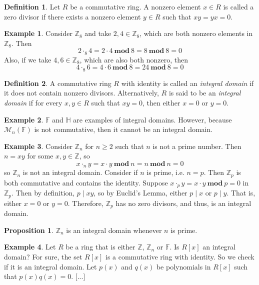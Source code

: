 \documentclass[11pt]{amsart}
\theoremstyle{definition}\newtheorem{definition}{Definition}
\theoremstyle{definition}\newtheorem{example}{Example}
\theoremstyle{theorem}\newtheorem{theorem}{Theorem}
\theoremstyle{theorem}\newtheorem{corollary}{Corollary}
\theoremstyle{theorem}\newtheorem{proposition}{Proposition}
\theoremstyle{theorem}\newtheorem{lemma}{Lemma}
\theoremstyle{theorem}\newtheorem{question}{Question}
\theoremstyle{remark}\newtheorem{remark}{Remark}
\newcommand{\Z}{\mathbb{Z}}
\newcommand{\F}{\mathbb{F}}
\newcommand{\M}{\mathcal{M}}
\renewcommand{\H}{\mathbb{H}}
\renewcommand{\mod}{\ \mathbf{mod} \ }
\begin{document}
\begin{definition}\label{definition:4}
    Let $R$ be a commutative ring. A nonzero element $x \in R$ is called a zero divisor if there exists a nonzero element $y \in R$ such that $xy = yx = 0$.
\end{definition}

\begin{example}\label{example:4}
    Consider $\Z_8$ and take $2, 4 \in \Z_8$, which are both nonzero elements in $\Z_8$. Then
    \begin{equation*}
        2 \cdot_8 4 = 2 \cdot 4 \mod 8 = 8 \mod 8 = 0
    \end{equation*}
    Also, if we take $4, 6 \in \Z_8$, which are also both nonzero, then
    \begin{equation*}
        4 \cdot_8 6 = 4 \cdot 6 \mod 8 = 24 \mod 8 = 0
    \end{equation*}
\end{example}

\begin{definition}\label{definition:5}
    A commutative ring $R$ with identity is called an \emph{integral domain} if it does not contain nonzero divisors. Alternatively, $R$ is said to be an \emph{integral domain} if for every $x, y \in R$ such that $xy = 0$, then either $x = 0$ or $y = 0$.
\end{definition}

\begin{example}\label{example:5}
    $\F$ and $\H$ are examples of integral domains. However, because $\M_n(\F)$ is not commutative, then it cannot be an integral domain.
\end{example}

\begin{example}\label{example:6}
    Consider $\Z_n$ for $n \geq 2$ such that $n$ is not a prime number. Then $n = xy$ for some $x, y \in \Z$, so
    \begin{equation*}
        x \cdot_n y = x \cdot y \mod n = n \mod n = 0
    \end{equation*}
    so $\Z_n$ is not an integral domain. Consider if $n$ is prime, i.e. $n = p$. Then $\Z_p$ is both commutative and contains the identity. Suppose $x \cdot_p y = x \cdot y \mod p = 0$ in $\Z_p$. Then by definition, $p \mid xy$, so by Euclid's Lemma, either $p \mid x$ or $p \mid y$. That is, either $x = 0$ or $y = 0$. Therefore, $\Z_p$ has no zero divisors, and thus, is an integral domain.
\end{example}

\begin{proposition}\label{proposition:2}
    $\Z_n$ is an integral domain whenever $n$ is prime.
\end{proposition}

\begin{example}\label{example:7}
    Let $R$ be a ring that is either $\Z$, $\Z_n$ or $\F$. Is $R[x]$ an integral domain? For sure, the set $R[x]$ is a commutative ring with identity. So we check if it is an integral domain. Let $p(x)$ and $q(x)$ be polynomials in $R[x]$ such that $p(x)q(x) = 0$. [...]
\end{example}
\end{document}
